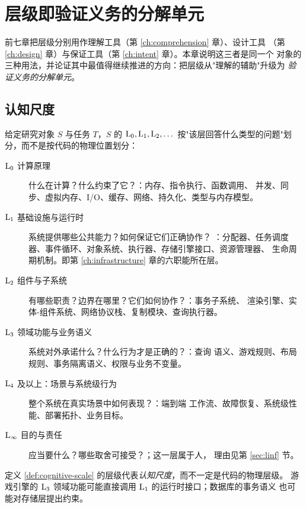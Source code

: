 \chapter[层级与验证义务]{层级即验证义务的分解单元}\label{ch:levels}

前七章把层级分别用作理解工具（第 \ref{ch:comprehension} 章）、设计工具
（第 \ref{ch:design} 章）与保证工具（第 \ref{ch:intent} 章）。本章说明这三者是同一个
对象的三种用法，并论证其中最值得继续推进的方向：把层级从"理解的辅助"升级为
\emph{验证义务的分解单元}。

\section{认知尺度}\label{sec:levels-def}

\begin{definition}[认知尺度]\label{def:cognitive-scale}
给定研究对象 $S$ 与任务 $T$，$S$ 的 $\mathrm{L}_{0}, \mathrm{L}_{1}, \mathrm{L}_{2}, \dots$
按"该层回答什么类型的问题"划分，而不是按代码的物理位置划分：
\begin{description}
\item[$\mathrm{L}_{0}$ 计算原理] 什么在计算？什么约束了它？：内存、指令执行、函数调用、
      并发、同步、虚拟内存、I/O、缓存、网络、持久化、类型与内存模型。
\item[$\mathrm{L}_{1}$ 基础设施与运行时] 系统提供哪些公共能力？如何保证它们正确协作？
      ：分配器、任务调度器、事件循环、对象系统、执行器、存储引擎接口、资源管理器、
      生命周期机制。即第 \ref{ch:infrastructure} 章的六职能所在层。
\item[$\mathrm{L}_{2}$ 组件与子系统] 有哪些职责？边界在哪里？它们如何协作？：事务子系统、
      渲染引擎、实体-组件系统、网络协议栈、复制模块、查询执行器。
\item[$\mathrm{L}_{3}$ 领域功能与业务语义] 系统对外承诺什么？什么行为才是正确的？：查询
      语义、游戏规则、布局规则、事务隔离语义、权限与业务不变量。
\item[$\mathrm{L}_{4}$ 及以上：场景与系统级行为] 整个系统在真实场景中如何表现？：端到端
      工作流、故障恢复、系统级性能、部署拓扑、业务目标。
\item[$\mathrm{L}_{\infty}$ 目的与责任] 应当要什么？哪些取舍可接受？；这一层属于人，
      理由见第 \ref{sec:linf} 节。
\end{description}
\end{definition}

\begin{principle}[认知尺度不是物理层级]\label{pr:not-physical}
定义 \ref{def:cognitive-scale} 的层级代表\emph{认知尺度}，而不一定是代码的物理层级。
游戏引擎的 $\mathrm{L}_{3}$ 领域功能可能直接调用 $\mathrm{L}_{1}$ 的运行时接口；数据库的事务语义
也可能对存储层提出约束。
\end{principle}

